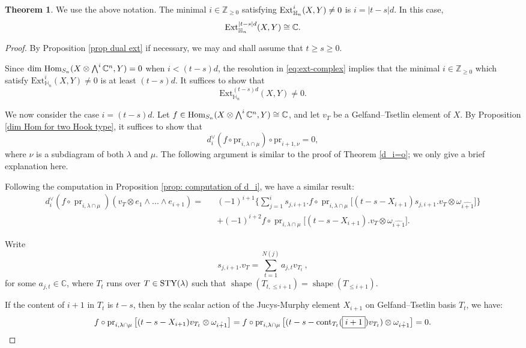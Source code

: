 \documentclass[11pt]{amsart}
\numberwithin{equation}{section}
\theoremstyle{definition}
\newtheorem{theorem}[thm]{Theorem}
\begin{document}
\begin{theorem}\label{thm: Ext for two quasi-rectangula}
We use the above notation. The minimal $i \in \mathbb Z_{\geq 0}$ satisfying $\textnormal{Ext}_{\mathbb{H}_{n}}^{i}(X, Y)\neq0$ is $i=|t-s|d$. In this case, 
    \[ \textnormal{Ext}_{\mathbb{H}_{n}}^{|t-s|d}(X, Y)\cong\mathbb{C}. \]
\end{theorem}
\begin{proof}
By Proposition \ref{prop dual ext} if necessary, we may and shall assume that $t \geq s \geq 0$.

    Since $\textnormal{dim Hom}_{S_{n}}(X\otimes\bigwedge^{i}\mathbb{C}^{n},Y)=0$ when $i<(t-s)d$, the resolution in \eqref{eq:ext-complex} implies that the minimal \(i \in \mathbb Z_{\geq 0}\) which satisfy \(\mathrm{Ext}^i_{\mathbb H_n}(X,Y)\neq 0\) is at least \((t-s)d\). It suffices to show that 
    \[  \mathrm{Ext}^{(t-s)d}_{\mathbb H_n}(X, Y) \neq 0 .    \]
    
    We now consider the case $i=(t-s)d$.
    Let $f\in\textnormal{Hom}_{S_{n}}(X\otimes\bigwedge^{i}\mathbb{C}^{n},Y)\cong\mathbb{C}$, and let $v_{T}$ be a Gelfand–Tsetlin element of $X$. By Proposition \ref{dim Hom for two Hook type}, it suffices to show that 
    \[  d_i^{\vee}(f\circ \mathrm{pr}_{i, \lambda\cap \mu}) \circ \mathrm{pr}_{i+1, \nu} =0,
    \]
    where \( \nu \) is a subdiagram of both \(\lambda\) and \(\mu\).  The following argument is similar to the proof of Theorem  \ref{d_i=o}; we only give a brief explanation here.
    
    Following the computation in Proposition \ref{prop: computation of d_i}, we have a similar result:
\begin{eqnarray*}
    d_{i}^{\vee}(f\circ\operatorname{pr}_{i,\lambda\cap\mu})(v_{T}\otimes e_{1}\wedge...\wedge e_{i+1})=&&
    (-1)^{i+1}\Bigg\{\sum_{j=1}^{i} s_{j,i+1}.f\circ\operatorname{pr}_{i,\lambda\cap\mu}\big[(t-s-X_{i+1})s_{j,i+1}.v_{T}\otimes\omega_{\hat{i+1}} \big]\Bigg\}\\
    &&+(-1)^{i+2}f\circ\operatorname{pr}_{i,\lambda\cap\mu}\big[(t-s-X_{i+1}).v_{T}\otimes\omega_{\hat{i+1}}\big].
\end{eqnarray*}

Write 
 $$s_{j,i+1}.v_{T}=\sum_{t=1}^{N(j)}a_{j,t}v_{T_{t}}\ , $$
 for some \(a_{j,t} \in \mathbb C\), 
where \(T_{t}\) runs over \(T \in \textnormal{STY}(\lambda)\) such that $\operatorname{shape}(T_{t,\leq i+1})=\operatorname{shape}(T_{\leq i+1})$.

If the content of $\boxed{i+1}$ in $T_{t}$ is $t-s$, then by the scalar action of the Jucys-Murphy element $X_{i+1}$ on Gelfand–Tsetlin basis $T_{t}$, we have:
\begin{eqnarray*}
    f\circ\operatorname{pr}_{i,\lambda\cap\mu}\big[(t-s-X_{i+1})v_{T_{t}}\otimes\omega_{\hat{i+1}} \big]
    =f\circ\operatorname{pr}_{i,\lambda\cap\mu}\big[(t-s-\textnormal{cont}_{T_{t}}(\boxed{i+1})v_{T_{t}})\otimes\omega_{\hat{i+1}}\big]=0.
\end{eqnarray*}


\end{proof}
\end{document}
